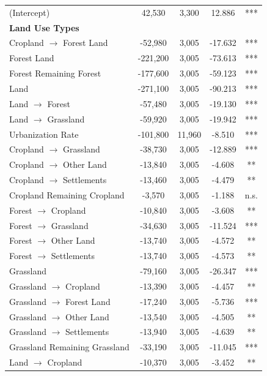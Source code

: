 \documentclass[10pt,letterpaper]{article}
\begin{document}
\begin{longtable}{lcccc}
	(Intercept) & 42,530 & 3,300 & 12.886 & *** \\
	\textbf{Land Use Types} & & & & \\
	\rowcolor{gray!20} Cropland $\rightarrow$ Forest Land & -52,980 & 3,005 & -17.632 & *** \\
	\rowcolor{gray!20} Forest Land & -221,200 & 3,005 & -73.613 & *** \\
	\rowcolor{gray!20} Forest Remaining Forest & -177,600 & 3,005 & -59.123 & *** \\
	\rowcolor{gray!20} Land & -271,100 & 3,005 & -90.213 & *** \\
	\rowcolor{gray!20} Land $\rightarrow$ Forest & -57,480 & 3,005 & -19.130 & *** \\
	\rowcolor{gray!20} Land $\rightarrow$ Grassland & -59,920 & 3,005 & -19.942 & *** \\
	\rowcolor{gray!20} Urbanization Rate & -101,800 & 11,960 & -8.510 & *** \\
	Cropland $\rightarrow$ Grassland & -38,730 & 3,005 & -12.889 & *** \\
	Cropland $\rightarrow$ Other Land & -13,840 & 3,005 & -4.608 & ** \\
	Cropland $\rightarrow$ Settlements & -13,460 & 3,005 & -4.479 & ** \\
	Cropland Remaining Cropland & -3,570 & 3,005 & -1.188 & n.s. \\
	Forest $\rightarrow$ Cropland & -10,840 & 3,005 & -3.608 & ** \\
	Forest $\rightarrow$ Grassland & -34,630 & 3,005 & -11.524 & *** \\
	Forest $\rightarrow$ Other Land & -13,740 & 3,005 & -4.572 & ** \\
	Forest $\rightarrow$ Settlements & -13,740 & 3,005 & -4.573 & ** \\
	Grassland & -79,160 & 3,005 & -26.347 & *** \\
	Grassland $\rightarrow$ Cropland & -13,390 & 3,005 & -4.457 & ** \\
	Grassland $\rightarrow$ Forest Land & -17,240 & 3,005 & -5.736 & *** \\
	Grassland $\rightarrow$ Other Land & -13,540 & 3,005 & -4.505 & ** \\
	Grassland $\rightarrow$ Settlements & -13,940 & 3,005 & -4.639 & ** \\
	Grassland Remaining Grassland & -33,190 & 3,005 & -11.045 & *** \\
	Land $\rightarrow$ Cropland & -10,370 & 3,005 & -3.452 & ** \\

\end{longtable}
\end{document}
